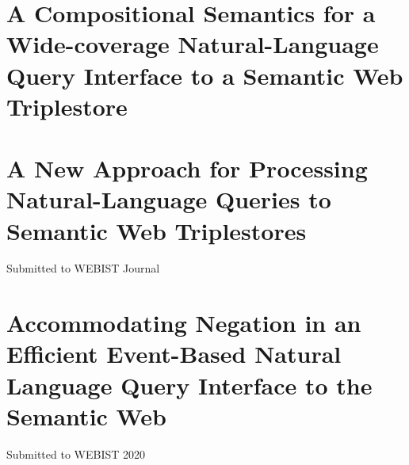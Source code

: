 \documentclass[../main.tex]{subfiles}
\begin{document}
\begin{refsection}
\section{A Compositional Semantics for a Wide-coverage Natural-Language Query Interface to a Semantic Web Triplestore}

\section{A New Approach for Processing Natural-Language Queries to Semantic Web Triplestores}

Submitted to WEBIST Journal

\section{Accommodating Negation in an Efficient Event-Based Natural Language Query Interface to the Semantic Web}

Submitted to WEBIST 2020

\printbibliography[heading=subbibintoc]
\end{refsection}
\end{document}

